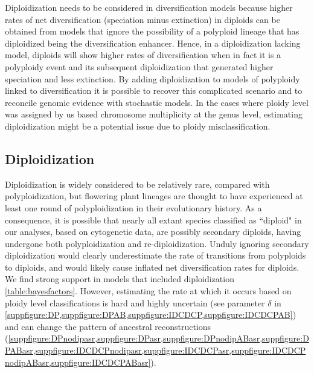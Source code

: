 
Diploidization needs to be considered in diversification models because higher rates of net diversification (speciation minus extinction) in diploids can be obtained from models that ignore the possibility of a polyploid lineage that has diploidized being the diversification enhancer. 
Hence, in a diploidization lacking model, diploids will show higher rates of diversification when in fact it is a polyploidy event and its subsequent diploidization that generated higher speciation and less extinction.  
By adding diploidization to models of polyploidy linked to diversification it is possible to recover this complicated scenario and to reconcile genomic evidence with stochastic models. 
In the cases where ploidy level was assigned by us based chromosome multiplicity at the genus level, estimating diploidization  might be a potential issue due to ploidy misclassification.  


\subsection*{Diploidization}

Diploidization is widely considered to be relatively rare, compared with polyploidization, but flowering plant lineages are thought to have experienced at least one round of polyploidization in their evolutionary history. %
As a consequence, it is possible that nearly all extant species classified as ``diploid" in our analyses, based on cytogenetic data, are possibly secondary diploids, having undergone both polyploidization and re-diploidization.
Unduly ignoring secondary diploidization would clearly underestimate the rate of transitions from polyploids to diploids, and would likely cause inflated net diversification rates for diploids. %
We find strong support in models that included diploidization \cref{table:bayesfactors}. However, estimating the rate at which it occurs based on ploidy level classifications is hard and highly uncertain (see parameter $\delta$ in \cref{suppfigure:DP,suppfigure:DPAB,suppfigure:IDCDCP,suppfigure:IDCDCPAB}) and can change the pattern of ancestral reconstructions (\cref{suppfigure:DPnodipasr,suppfigure:DPasr,suppfigure:DPnodipABasr,suppfigure:DPABasr,suppfigure:IDCDCPnodipasr,suppfigure:IDCDCPasr,suppfigure:IDCDCPnodipABasr,suppfigure:IDCDCPABasr}).

